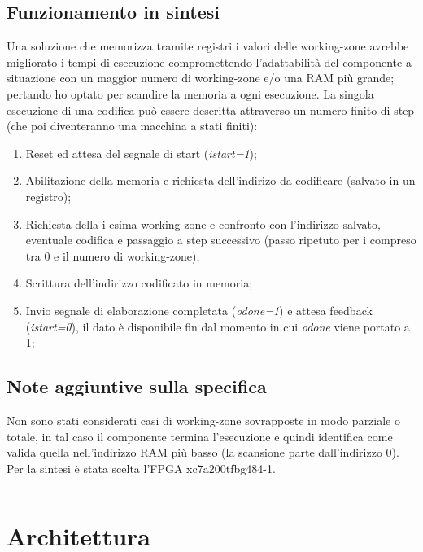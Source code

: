 \documentclass{article}
\begin{document}
\subsection{Funzionamento in sintesi}
Una soluzione che memorizza tramite registri i valori delle working-zone avrebbe migliorato i tempi di esecuzione compromettendo l'adattabilità del componente a situazione con un maggior numero di working-zone e/o una RAM più grande; pertando ho optato per scandire la memoria a ogni esecuzione.
La singola esecuzione di una codifica può essere descritta attraverso un numero finito di step (che poi diventeranno una macchina a stati finiti):
\begin{enumerate}
	\item Reset ed attesa del segnale di start (\textit{i\textunderscore start=1});
	\item Abilitazione della memoria e richiesta dell'indirizo da codificare (salvato in un registro);
	\item Richiesta della i-esima working-zone e confronto con l'indirizzo salvato, eventuale codifica e passaggio a step successivo (passo ripetuto per i compreso tra 0 e il numero di working-zone);
	\item Scrittura dell'indirizzo codificato in memoria;
	\item Invio segnale di elaborazione completata (\textit{o\textunderscore done=1}) e attesa feedback (\textit{i\textunderscore start=0}), il dato è disponibile fin dal momento in cui \textit{o\textunderscore done} viene portato a 1;
\end{enumerate}
\subsection{Note aggiuntive sulla specifica}
Non sono stati considerati casi di working-zone sovrapposte in modo parziale o totale, in tal caso il componente termina l'esecuzione e quindi identifica come valida quella nell'indirizzo RAM più basso (la scansione parte dall'indirizzo 0).
Per la sintesi è stata scelta l'FPGA xc7a200tfbg484-1.

\noindent\rule{\textwidth}{0.5pt}
\newpage
\section{Architettura}
\end{document}
